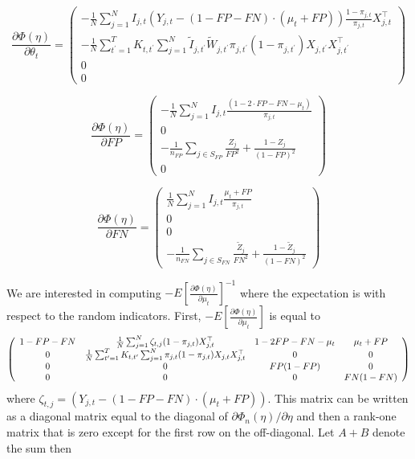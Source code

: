 \documentclass[12pt]{amsart}
\numberwithin{equation}{section}
\theoremstyle{plain}
\begin{document}
$$
\frac{\partial \Phi (\eta)}{\partial \theta_t} =
\left (
\begin{array}{c}
-\frac{1}{N} \sum_{j=1}^N I_{j,t} (Y_{j,t} - (1-FP-FN) \cdot (\mu_t + FP)) \frac{1-\pi_{j,t}}{\pi_{j,t}} X_{j,t}^\top \\
- \frac{1}{N} \sum_{t^\prime = 1}^T K_{t,t^\prime} \sum_{j = 1}^N \tilde I_{j,t^\prime} \tilde W_{j,t^\prime}  \pi_{j,t^\prime} (1-\pi_{j,t^\prime}) X_{j,t^\prime} X_{j,t^\prime}^\top\\
0 \\
0
\end{array}
\right )
$$

$$
\frac{\partial \Phi (\eta)}{\partial FP} =
\left (
\begin{array}{c}
-\frac{1}{N} \sum_{j=1}^N I_{j,t} \frac{(1-2 \cdot FP-FN -\mu_t)}{\pi_{j,t}} \\
0\\
-\frac{1}{n_{FP}} \sum_{j \in S_{FP}} \frac{Z_j}{FP^2} + \frac{1-Z_j}{(1-FP)^2}  \\
0
\end{array}
\right )
$$

$$
\frac{\partial \Phi (\eta)}{\partial FN} =
\left (
\begin{array}{c}
\frac{1}{N} \sum_{j=1}^N I_{j,t} \frac{\mu_t+FP}{\pi_{j,t}} \\
0\\
0 \\
-\frac{1}{n_{FN}} \sum_{j \in S_{FN}} \frac{\tilde Z_j}{FN^2} + \frac{1-\tilde Z_j}{(1-FN)^2}
\end{array}
\right )
$$

We are interested in computing $- E \left[ \frac{\partial \Phi (\eta)}{\partial \mu_t} \right]^{-1}$ where the expectation is with respect to the random indicators. First, $- E \left[ \frac{\partial \Phi (\eta)}{\partial \mu_t} \right]$ is equal to
$$
\left (
\begin{array}{c c c c}
1-FP-FN & \frac{1}{N} \sum_{j=1}^N \zeta_{t,j} (1-\pi_{j,t}) X_{j,t}^\top & 1 - 2FP-FN - \mu_t & \mu_t + FP \\
0 & \frac{1}{N} \sum_{t^\prime=1}^T K_{t,t^\prime} \sum_{j=1}^N \pi_{j,t} (1-\pi_{j,t}) X_{j,t} X_{j,t}^\top & 0 & 0\\
0 & 0 & FP (1-FP)  & 0\\
0 & 0 & 0 & FN (1-FN)
\end{array}
\right )
$$
where $\zeta_{t,j} = (Y_{j,t} - (1-FP-FN) \cdot (\mu_t + FP))$. This matrix can be written as a diagonal matrix equal to the diagonal of $\partial \Phi_n (\eta)/\partial \eta$ and then a rank-one matrix that is zero except for the first row on the off-diagonal. Let $A + B$ denote the sum then
\end{document}
